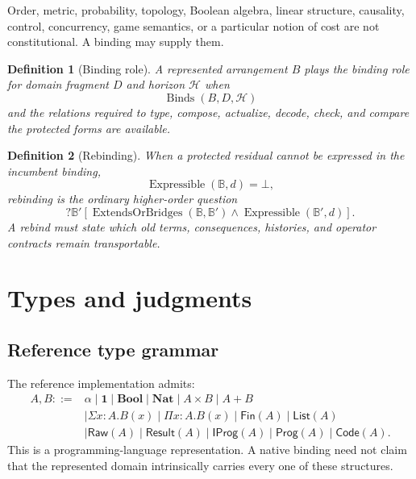 \documentclass[11pt,oneside]{article}
\newtheorem{definition}{Definition}[section]
\newcommand{\B}{\mathbb B}
\newcommand{\Prog}{\mathsf{Prog}}
\newcommand{\Raw}{\mathsf{Raw}}
\newcommand{\Result}{\mathsf{Result}}
\begin{document}
Order, metric, probability, topology, Boolean algebra, linear structure, causality, control, concurrency, game semantics, or a particular notion of cost are not constitutional.  A binding may supply them.

\begin{definition}[Binding role]
A represented arrangement \(B\) plays the binding role for domain fragment \(D\) and horizon \(\mathcal H\) when
\[
\operatorname{Binds}(B,D,\mathcal H)
\]
and the relations required to type, compose, actualize, decode, check, and compare the protected forms are available.
\end{definition}

\begin{definition}[Rebinding]
When a protected residual cannot be expressed in the incumbent binding,
\[
\operatorname{Expressible}(\B,d)=\bot,
\]
rebinding is the ordinary higher-order question
\[
?\B'[
\operatorname{ExtendsOrBridges}(\B,\B')
\land
\operatorname{Expressible}(\B',d)
].
\]
A rebind must state which old terms, consequences, histories, and operator contracts remain transportable.
\end{definition}

\section{Types and judgments}

\subsection{Reference type grammar}

The reference implementation admits:
\[
\begin{aligned}
A,B ::= {}&
\alpha
\mid \mathbf 1
\mid \mathbf{Bool}
\mid \mathbf{Nat}
\mid A\times B
\mid A+B\\
&\mid \Sigma x:A.B(x)
\mid \Pi x:A.B(x)
\mid \mathsf{Fin}(A)
\mid \mathsf{List}(A)\\
&\mid \Raw(A)
\mid \Result(A)
\mid \mathsf{IProg}(A)
\mid \Prog(A)
\mid \mathsf{Code}(A).
\end{aligned}
\]
This is a programming-language representation.  A native binding need not claim that the represented domain intrinsically carries every one of these structures.
\end{document}
